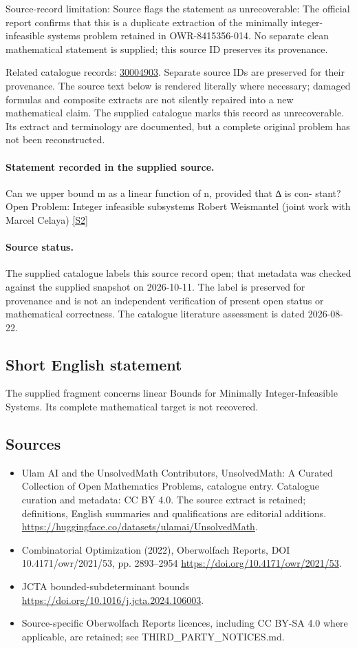 \documentclass[11pt]{article}
\begin{document}
Source-record limitation: Source flags the statement as unrecoverable: The official report confirms that this is a duplicate extraction of the minimally integer-infeasible systems problem retained in OWR-8415356-014. No separate clean mathematical statement is supplied; this source ID preserves its provenance.

Related catalogue records: \href{https://mehmetmars7.github.io/Erdosproblems-llm-hunter/problem.html?type=open_problems&id=30004903}{30004903}. Separate source IDs are preserved for their provenance.
The source text below is rendered literally where necessary; damaged formulas and composite extracts are not silently repaired into a new mathematical claim.
The supplied catalogue marks this record as unrecoverable. Its extract and terminology are documented, but a complete original problem has not been reconstructed.
\paragraph{Statement recorded in the supplied source.}
Can we upper bound m as a linear function of n, provided that ∆ is con- stant? Open Problem: Integer infeasible subsystems Robert Weismantel (joint work with Marcel Celaya) \href{https://doi.org/10.4171/owr/2021/53}{[S2]}
\paragraph{Source status.}
The supplied catalogue labels this source record open; that metadata was checked against the supplied snapshot on 2026-10-11. The label is preserved for provenance and is not an independent verification of present open status or mathematical correctness. The catalogue literature assessment is dated 2026-08-22.
\subsection{Short English statement}
The supplied fragment concerns linear Bounds for Minimally Integer-Infeasible Systems. Its complete mathematical target is not recovered.
\subsection{Sources}
\begin{itemize}
\item[S1] Ulam AI and the UnsolvedMath Contributors, UnsolvedMath: A Curated Collection of Open Mathematics Problems, catalogue entry. Catalogue curation and metadata: CC BY 4.0. The source extract is retained; definitions, English summaries and qualifications are editorial additions.
\url{https://huggingface.co/datasets/ulamai/UnsolvedMath}.
\item[S2] Combinatorial Optimization (2022), Oberwolfach Reports, DOI 10.4171/owr/2021/53, pp. 2893--2954
\url{https://doi.org/10.4171/owr/2021/53}.
\item[S3] JCTA bounded-subdeterminant bounds
\url{https://doi.org/10.1016/j.jcta.2024.106003}.
\item Source-specific Oberwolfach Reports licences, including CC BY-SA 4.0 where applicable, are retained; see THIRD\_PARTY\_NOTICES.md.
\end{itemize}
\end{document}
